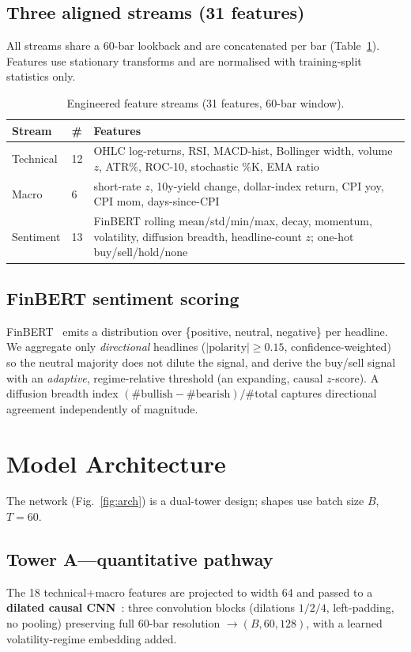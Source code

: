 \documentclass[conference]{IEEEtran}
\begin{document}
\subsection{Three aligned streams (31 features)}
All streams share a 60-bar lookback and are concatenated per bar (Table~\ref{tab:feat}).
Features use stationary transforms and are normalised with training-split statistics only.

\begin{table}[t]
\caption{Engineered feature streams (31 features, 60-bar window).}
\label{tab:feat}
\centering
\begin{tabular}{@{}p{1.3cm}p{0.5cm}p{5.7cm}@{}}
\toprule
\textbf{Stream} & \textbf{\#} & \textbf{Features} \\
\midrule
Technical & 12 & OHLC log-returns, RSI, MACD-hist, Bollinger width, volume $z$, ATR\%,
ROC-10, stochastic \%K, EMA ratio \\
Macro & 6 & short-rate $z$, 10y-yield change, dollar-index return, CPI yoy, CPI mom,
days-since-CPI \\
Sentiment & 13 & FinBERT rolling mean/std/min/max, decay, momentum, volatility, diffusion
breadth, headline-count $z$; one-hot buy/sell/hold/none \\
\bottomrule
\end{tabular}
\end{table}

\subsection{FinBERT sentiment scoring}
FinBERT~\cite{finbert} emits a distribution over \{positive, neutral, negative\} per
headline. We aggregate only \emph{directional} headlines ($|\text{polarity}|\ge 0.15$,
confidence-weighted) so the neutral majority does not dilute the signal, and derive the
buy/sell signal with an \emph{adaptive}, regime-relative threshold (an expanding, causal
$z$-score). A diffusion breadth index
$(\#\text{bullish}-\#\text{bearish})/\#\text{total}$ captures directional agreement
independently of magnitude.

\section{Model Architecture}
The network (Fig.~\ref{fig:arch}) is a dual-tower design; shapes use batch size $B$,
$T{=}60$.
\subsection{Tower A---quantitative pathway}
The 18 technical+macro features are projected to width 64 and passed to a \textbf{dilated
causal CNN}~\cite{wavenet,tcn}: three convolution blocks (dilations $1/2/4$, left-padding,
no pooling) preserving full 60-bar resolution $\rightarrow(B,60,128)$, with a learned
volatility-regime embedding added.
\end{document}
